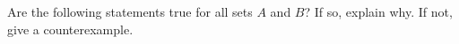 \documentclass[11pt]{exam}
\begin{document}
\begin{questions}
\begin{multicols}{3}
\end{multicols}

\vfill

\question Are the following statements true for all sets $A$ and $B$?  If so, explain why.  If not, give a counterexample.


\end{questions}
\newpage
\end{document}
